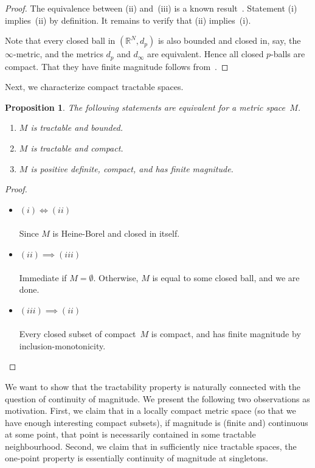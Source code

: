 \documentclass[11pt]{article}
\theoremstyle{plain}
\newtheorem{proposition}[theorem]{Proposition}
\theoremstyle{definition}
\newcommand{\proven}[1]{\underline{#1} \\ \ \vspace{-2ex} \\}
\newcommand{\RR}{\mathbb{R}}
\begin{document}
\begin{proof}
The equivalence between (ii) and~(iii) is a known result~\cite[Theorem~4.10]{LM17}. Statement (i) implies~(ii) by definition. It remains to verify that (ii) implies~(i).

Note that every closed ball in $(\RR^N, d_p)$ is also bounded and closed in, say, the $\infty$-metric, and the metrics $d_p$ and $d_\infty$ are equivalent. Hence all closed $p$-balls are compact. That they have finite magnitude follows from~\cite[Proposition~4.13]{LM17}.
\end{proof}

Next, we characterize compact tractable spaces.

\begin{proposition}\label{proposition:compact-tractable-spaces}
The following statements are equivalent for a metric space~$M$.
\begin{enumerate}[label=(\roman*)]
\item
$M$ is tractable and bounded.
\item
$M$ is tractable and compact.
\item
$M$ is positive definite, compact, and has finite magnitude.
\end{enumerate}
\end{proposition}

\begin{proof}
\
\begin{itemize}
\item\proven{$(i) \iff (ii)$}
Since $M$ is Heine-Borel and closed in itself.
\item\proven{$(ii) \implies (iii)$}
Immediate if $M = \emptyset$. Otherwise, $M$ is equal to some closed ball, and we are done.
\item\proven{$(iii) \implies (ii)$}
Every closed subset of compact~$M$ is compact, and has finite magnitude by inclusion-monotonicity.
\end{itemize}
\end{proof}

We want to show that the tractability property is naturally connected with the question of continuity of magnitude. We present the following two observations as motivation. First, we claim that in a locally compact metric space (so that we have enough interesting compact subsets), if magnitude is (finite and) continuous at some point, that point is necessarily contained in some tractable neighbourhood. Second, we claim that in sufficiently nice tractable spaces, the one-point property is essentially continuity of magnitude at singletons.
\end{document}
